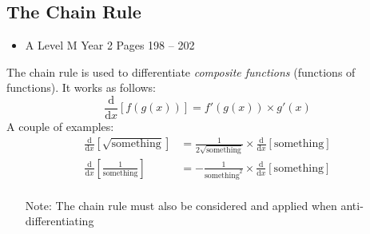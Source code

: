 \documentclass[11pt, a4paper]{article}
\begin{document}
\subsection{The Chain Rule}
\label{chainrule}
\begin{itemize}
\item A Level M Year 2 \hspace{1cm} \phantom{ AS / } Pages 198 -- 202
\end{itemize} \par
The chain rule is used to differentiate \emph{composite functions} (functions of functions). It works as follows:
\begin{equation*}
\frac{\mathrm{d}}{\mathrm{d}x}\left[ f(g(x)) \right]=f'(g(x))\times g'(x)
\end{equation*}
A couple of examples:
\begin{align*}
\frac{\mathrm{d}}{\mathrm{d}x}\left[\sqrt{\text{something}}\right]&=\frac{1}{2\sqrt{\text{something}}}\times\frac{\mathrm{d}}{\mathrm{d}x}\left[\text{something}\right] \\
\frac{\mathrm{d}}{\mathrm{d}x}\left[\frac{1}{\text{something}}\right]&=-\frac{1}{\text{something}^{2}}\times\frac{\mathrm{d}}{\mathrm{d}x}\left[\text{something}\right] \\
\end{align*}
\begin{itemize}
\item[Note:] The chain rule must also be considered and applied when anti-differenti\-ating
\end{itemize}
\vspace{0.5cm}
\newpage
\end{document}
